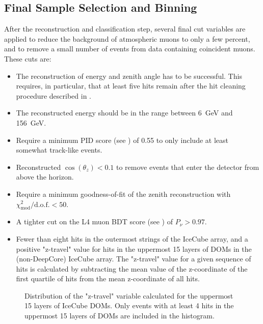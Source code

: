 \subsection{Final Sample Selection and Binning}
\label{sec:final-sample-binning}
After the reconstruction and classification step, several final cut variables are applied to reduce the background of atmospheric muons to only a few percent, and to remove a small number of events from data containing coincident muons. These cuts are:
\begin{itemize}
    \item The reconstruction of energy and zenith angle has to be successful. This requires, in particular, that at least five hits remain after the hit cleaning procedure described in .
    \item The reconstructed energy should be in the range between \SI{6}{\giga\electronvolt} and \SI{156}{\giga\electronvolt}.
    \item Require a minimum PID score (see ) of 0.55 to only include at least somewhat track-like events.
    \item Reconstructed $\cos(\theta_z) < 0.1$ to remove events that enter the detector from above the horizon.
    \item Require a minimum goodness-of-fit of the zenith reconstruction with $\chi^2_{\mathrm{mod}}/\mathrm{d.o.f.} < 50$.
    \item A tighter cut on the L4 muon BDT score (see ) of $P_\nu > 0.97$.
    \item Fewer than eight hits in the outermost strings of the IceCube array, and a positive "z-travel" value for hits in the uppermost 15 layers of DOMs in the (non-DeepCore) IceCube array. The "z-travel" value for a given sequence of hits is calculated by subtracting the mean value of the z-coordinate of the first quartile of hits from the mean z-coordinate of all hits.
\end{itemize}

\begin{figure}
    \centering
    
    \caption{Distribution of the "z-travel" variable calculated for the uppermost 15 layers of IceCube DOMs. Only events with at least 4 hits in the uppermost 15 layers of DOMs are included in the histogram.}
    \label{fig:z_travel_distribution}
\end{figure}

%     


